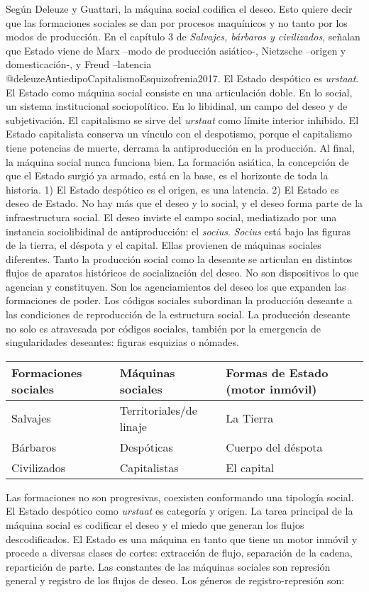 \documentclass[
]{article}
\begin{document}
Según Deleuze y Guattari, la máquina social codifica el deseo. Esto
quiere decir que las formaciones sociales se dan por procesos maquínicos
y no tanto por los modos de producción. En el capítulo 3 de
\emph{Salvajes, bárbaros y civilizados}, señalan que Estado viene de
Marx --modo de producción asiático-, Nietzsche --origen y
domesticación-, y Freud --latencia
@deleuzeAntiedipoCapitalismoEsquizofrenia2017. El Estado despótico es
\emph{urstaat}. El Estado como máquina social consiste en una
articulación doble. En lo social, un sistema institucional
sociopolítico. En lo libidinal, un campo del deseo y de subjetivación.
El capitalismo se sirve del \emph{urstaat} como límite interior
inhibido. El Estado capitalista conserva un vínculo con el despotismo,
porque el capitalismo tiene potencias de muerte, derrama la
antiproducción en la producción. Al final, la máquina social nunca
funciona bien. La formación asiática, la concepción de que el Estado
surgió ya armado, está en la base, es el horizonte de toda la historia.
1) El Estado despótico es el origen, es una latencia. 2) El Estado es
deseo de Estado. No hay más que el deseo y lo social, y el deseo forma
parte de la infraestructura social. El deseo inviste el campo social,
mediatizado por una instancia sociolibidinal de antiproducción: el
\emph{socius}. \emph{Socius} está bajo las figuras de la tierra, el
déspota y el capital. Ellas provienen de máquinas sociales diferentes.
Tanto la producción social como la deseante se articulan en distintos
flujos de aparatos históricos de socialización del deseo. No son
dispositivos lo que agencian y constituyen. Son los agenciamientos del
deseo los que expanden las formaciones de poder. Los códigos sociales
subordinan la producción deseante a las condiciones de reproducción de
la estructura social. La producción deseante no solo es atravesada por
códigos sociales, también por la emergencia de singularidades deseantes:
figuras esquizias o nómades.

\begin{longtable}[]{@{}lll@{}}
\toprule
\textbf{Formaciones sociales} & \textbf{Máquinas sociales} &
\textbf{Formas de Estado (motor inmóvil)}\tabularnewline
\midrule
\endhead
Salvajes & Territoriales/de linaje & La Tierra\tabularnewline
Bárbaros & Despóticas & Cuerpo del déspota\tabularnewline
Civilizados & Capitalistas & El capital\tabularnewline
\bottomrule
\end{longtable}

Las formaciones no son progresivas, coexisten conformando una tipología
social. El Estado despótico como \emph{urstaat} es categoría y origen.
La tarea principal de la máquina social es codificar el deseo y el miedo
que generan los flujos descodificados. El Estado es una máquina en tanto
que tiene un motor inmóvil y procede a diversas clases de cortes:
extracción de flujo, separación de la cadena, repartición de parte. Las
constantes de las máquinas sociales son represión general y registro de
los flujos de deseo. Los géneros de registro-represión son:
\end{document}
